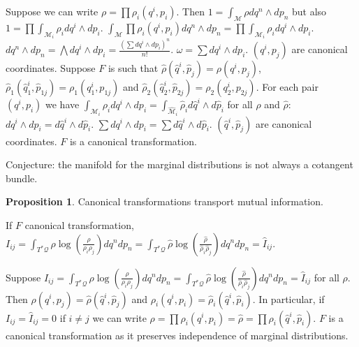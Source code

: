 \documentclass[smallextended]{svjour3}
\numberwithin{equation}{section}
\theoremstyle{definition}
\newtheorem{prop}[equation]{Proposition}
\begin{document}
Suppose we can write $\rho=\prod\rho_i(q^i,p_i)$. Then $1 = \int_{\mathcal{M}} \rho dq^n\wedge dp_n$ but also $1 = \prod \int_{\mathcal{M}_i} \rho_i dq^i\wedge dp_i$. $\int_{\mathcal{M}} \prod\rho_i(q^i,p_i) dq^n\wedge dp_n = \prod \int_{\mathcal{M}_i} \rho_i dq^i\wedge dp_i$. $dq^n\wedge dp_n = \bigwedge dq^i\wedge dp_i = \frac{(\sum dq^i\wedge dp_i)^n}{n!}$. $\omega = \sum dq^i\wedge dp_i$. $(q^i,p_j)$ are canonical coordinates. Suppose $F$ is such that $\hat{\rho}(\hat{q}^i, \hat{p}_j) = \rho(q^i, p_j)$, $\hat{\rho}_1(\hat{q}_1^i, \hat{p}_{1j})=\rho_1(q_1^i, p_{1j})$ and $\hat{\rho}_2(\hat{q}_2^i, \hat{p}_{2j})=\rho_2(q_2^i, p_{2j})$. For each pair $(q^i, p_i)$ we have $\int_{\mathcal{M}_i} \rho_i dq^i \wedge dp_i = \int_{\hat{\mathcal{M}}_i} \hat{\rho}_i d\hat{q}^i \wedge d\hat{p}_i$ for all $\rho$ and $\hat{\rho}$: $dq^i \wedge dp_i = d\hat{q}^i \wedge d\hat{p}_i$. $\sum dq^i \wedge dp_i = \sum d\hat{q}^i \wedge d\hat{p}_i$. $(\hat{q}^i,\hat{p}_j)$ are canonical coordinates. $F$ is a canonical transformation.

Conjecture: the manifold for the marginal distributions is not always a cotangent bundle.


\begin{prop}
	Canonical transformations transport mutual information.
\end{prop}

If $F$ canonical transformation, $I_{ij} = \int_{T^*\mathcal{Q}} \rho \log (\frac{\rho}{\rho_i \rho_j}) dq^n dp_n = \int_{T^*\mathcal{Q}} \hat{\rho} \log (\frac{\hat{\rho}}{\hat{\rho}_i \hat{\rho}_j}) dq^n dp_n = \hat{I}_{ij}$.

Suppose $I_{ij} = \int_{T^*\mathcal{Q}} \rho \log (\frac{\rho}{\rho_i \rho_j}) dq^n dp_n = \int_{T^*\mathcal{Q}} \hat{\rho} \log (\frac{\hat{\rho}}{\hat{\rho}_i \hat{\rho}_j}) dq^n dp_n = \hat{I}_{ij}$ for all $\rho$. Then $\rho(q^i, p_j)=\hat{\rho}(\hat{q}^i, \hat{p}_j)$ and $\rho_i(q^i, p_i)=\hat{\rho}_i(\hat{q}^i, \hat{p}_i)$. In particular, if $I_{ij} = \hat{I}_{ij} = 0$ if $i\neq j$ we can write $\rho=\prod\rho_i(q^i,p_i) = \hat{\rho} = \prod\rho_i(\hat{q}^i,\hat{p}_i)$. $F$ is a canonical transformation as it preserves independence of marginal distributions.

\begin{thebibliography}{0}
	
\end{thebibliography}
\end{document}

